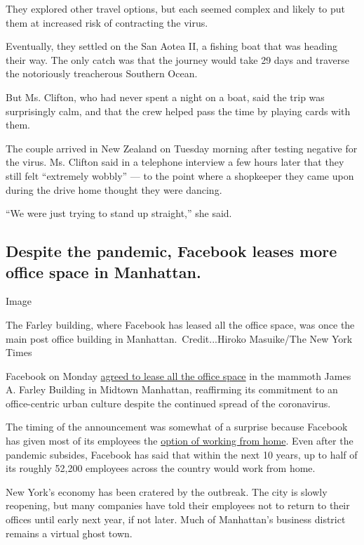 They explored other travel options, but each seemed complex and likely
to put them at increased risk of contracting the virus.

Eventually, they settled on the San Aotea II, a fishing boat that was
heading their way. The only catch was that the journey would take 29
days and traverse the notoriously treacherous Southern Ocean.

But Ms. Clifton, who had never spent a night on a boat, said the trip
was surprisingly calm, and that the crew helped pass the time by playing
cards with them.

The couple arrived in New Zealand on Tuesday morning after testing
negative for the virus. Ms. Clifton said in a telephone interview a few
hours later that they still felt ``extremely wobbly'' --- to the point
where a shopkeeper they came upon during the drive home thought they
were dancing.

``We were just trying to stand up straight,'' she said.

\hypertarget{despite-the-pandemic-facebook-leases-more-office-space-in-manhattan}{%
\subsection{Despite the pandemic, Facebook leases more office space in
Manhattan.}\label{despite-the-pandemic-facebook-leases-more-office-space-in-manhattan}}

Image

The Farley building, where Facebook has leased all the office space, was
once the main post office building in Manhattan.~Credit...Hiroko
Masuike/The New York Times

Facebook on Monday
\href{https://www.nytimes3xbfgragh.onion/2020/08/03/nyregion/facebook-nyc-office-farley-building.html}{agreed
to lease all the office space} in the mammoth James A. Farley Building
in Midtown Manhattan, reaffirming its commitment to an office-centric
urban culture despite the continued spread of the coronavirus.

The timing of the announcement was somewhat of a surprise because
Facebook has given most of its employees the
\href{https://www.nytimes3xbfgragh.onion/2020/05/21/technology/facebook-remote-work-coronavirus.html}{option
of working from home}. Even after the pandemic subsides, Facebook has
said that within the next 10 years, up to half of its roughly 52,200
employees across the country would work from home.

New York's economy has been cratered by the outbreak. The city is slowly
reopening, but many companies have told their employees not to return to
their offices until early next year, if not later. Much of Manhattan's
business district remains a virtual ghost town.

